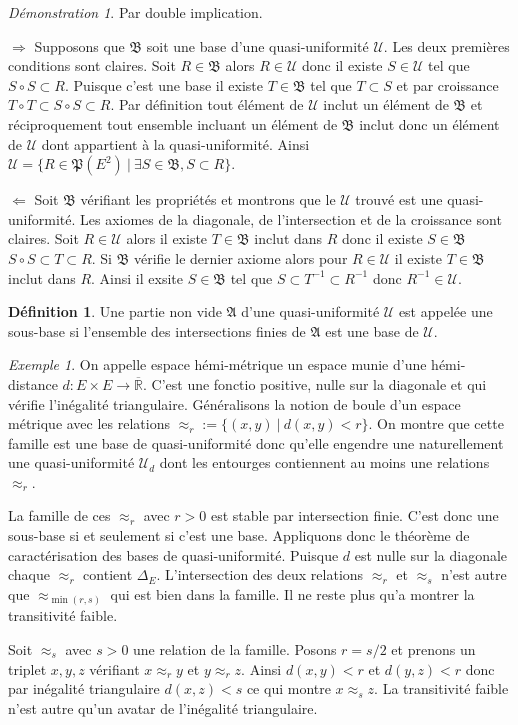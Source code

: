 \documentclass[a4paper, 11pt, french]{book}
\newenvironment{itemise}{\itemize}{\enditemize}
\theoremstyle{plain} %
\theoremstyle{definition} %
\newtheorem{definition}{Définition}
\theoremstyle{remark} %
\newtheorem{exemple}{Exemple}
\newtheorem*{demonstration}{Démonstration}
\newcommand{\1}{\mathds{1}}
\newcommand{\inv}[1]{#1^{-1}}
\newcommand{\R}{\mathbb{R}}
\renewcommand{\frak}[1]{\mathfrak{#1}}
\newcommand{\scr}[1]{\mathscr{#1}}
\newcommand\ens[2]{\{#1 \ |\ #2\}}
\newcommand\equivalence[3]{
	\begin{demonstration}
		#1
		\begin{itemise}
			\item[$\Longrightarrow$] #2
			\item[$\Longleftarrow$] #3
		\end{itemise}
	\end{demonstration}
}
\begin{document}
\equivalence{Par double implication.}{
	Supposons que $\frak{B}$ soit une base d'une quasi-uniformité $\scr{U}$.
	Les deux premières conditions sont claires.
	Soit $R\in\frak{B}$ alors $R\in\scr{U}$ donc il existe $S\in\scr{U}$ tel que $S\circ S\subset R$.
	Puisque c'est une base il existe $T\in\frak{B}$ tel que $T\subset S$ et par croissance $T\circ T\subset S\circ S\subset R$.
	Par définition tout élément de $\scr{U}$ inclut un élément de $\frak{B}$ et réciproquement tout ensemble incluant un élément de $\frak{B}$ inclut donc un élément de $\scr{U}$ dont appartient à la quasi-uniformité.
	Ainsi $\scr{U}=\ens{R\in\frak{P}(E^2)}{\exists S\in\frak{B}, S\subset R}$.
}{
	Soit $\frak{B}$ vérifiant les propriétés et montrons que le $\scr{U}$ trouvé est une quasi-uniformité.
	Les axiomes de la diagonale, de l'intersection et de la croissance sont claires.
	Soit $R\in\scr{U}$ alors il existe $T\in\frak{B}$ inclut dans $R$ donc il existe $S\in\frak{B}$ $S\circ S\subset T\subset R$.
	Si $\frak{B}$ vérifie le dernier axiome alors pour $R\in\scr{U}$ il existe $T\in\frak{B}$ inclut dans $R$.
	Ainsi il exsite $S\in\frak{B}$ tel que $S\subset\inv{T}\subset\inv{R}$ donc $\inv{R}\in\scr{U}$.
}

\begin{definition}
	Une partie non vide $\frak{A}$ d'une quasi-uniformité $\scr{U}$ est appelée une sous-base si l'ensemble des intersections finies de $\frak{A}$ est une base de $\scr{U}$.
\end{definition}

\begin{exemple}
	On appelle espace hémi-métrique un espace munie d'une hémi-distance $d\colon E\times E\rightarrow\overline{\R}$.
	C'est une fonctio positive, nulle sur la diagonale et qui vérifie l'inégalité triangulaire.
	Généralisons la notion de boule d'un espace métrique avec les relations $\approx_r :=\ens{(x, y)}{d(x, y)<r}$.
	On montre que cette famille est une base de quasi-uniformité donc qu'elle engendre une naturellement une quasi-uniformité $\scr{U}_d$ dont les entourges contiennent au moins une relations $\approx_r$.

	La famille de ces $\approx_r$ avec $r>0$ est stable par intersection finie.
	C'est donc une sous-base si et seulement si c'est une base.
	Appliquons donc le théorème de caractérisation des bases de quasi-uniformité.
	Puisque $d$ est nulle sur la diagonale chaque $\approx_r$ contient $\Delta_E$.
	L'intersection des deux relations $\approx_r$ et $\approx_s$ n'est autre que $\approx_{\min(r, s)}$ qui est bien dans la famille.
	Il ne reste plus qu'a montrer la transitivité faible.

	Soit $\approx_s$ avec $s>0$ une relation de la famille.
	Posons $r=s/2$ et prenons un triplet $x, y, z$ vérifiant $x\approx_ry$ et $y\approx_rz$.
	Ainsi $d(x, y)<r$ et $d(y, z)<r$ donc par inégalité triangulaire $d(x,z)<s$ ce qui montre $x\approx_s z$.
	La transitivité faible n'est autre qu'un avatar de l'inégalité triangulaire.
\end{exemple}
\end{document}
